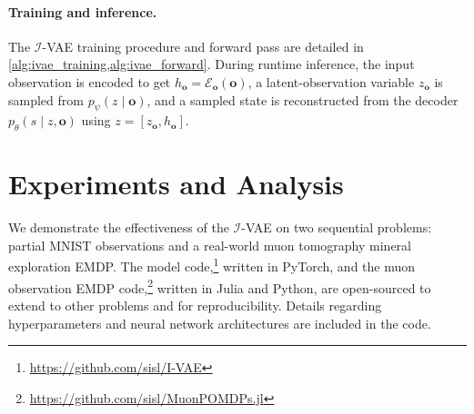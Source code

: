 \paragraph{Training and inference.}
The $\mathcal{I}$-VAE training procedure and forward pass are detailed in \cref{alg:ivae_training,alg:ivae_forward}.
During runtime inference, the input observation is encoded to get $h_\mathbf{o} = \mathcal{E}_\mathbf{o}(\mathbf{o})$, a latent-observation variable $z_\mathbf{o}$ is sampled from $p_\psi(z \mid \mathbf{o})$, and a sampled state is reconstructed from the decoder $p_\theta(s \mid z, \mathbf{o})$ using $z = [z_\mathbf{o}, h_\mathbf{o}]$.

\begin{figure}[b!]
    
    
\end{figure}

\section{Experiments and Analysis}\label{sec:ivae_experiments}
We demonstrate the effectiveness of the $\mathcal{I}$-VAE on two sequential problems: partial MNIST observations \cite{lecun1998gradient} and a real-world muon tomography mineral exploration EMDP.
The model code,\footnote{\url{https://github.com/sisl/I-VAE}} written in PyTorch, and the muon observation EMDP code,\footnote{\url{https://github.com/sisl/MuonPOMDPs.jl}} written in Julia and Python, are open-sourced to extend to other problems and for reproducibility.
Details regarding hyperparameters and neural network architectures are included in the code.



